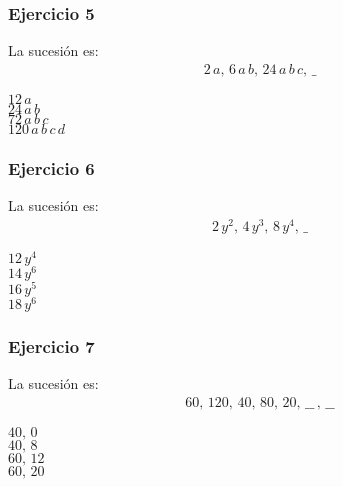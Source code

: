 \begin{frame}
\frametitle{Ejercicio 5}
La sucesión es:
\begin{align*}
2 \, a, \,  6 \, a \, b, \,  24 \, a \, b \, c, \, \_
\end{align*}
\begin{choices}
\choice $12 \, a$ \\
\choice $24 \, a \, b$ \\
\choice $72 \, a \, b \, c$ \\
\choice $120 \, a \, b \, c \, d$ \\
\end{choices}
\pause
{}
\end{frame}
\begin{frame}
\frametitle{Ejercicio 6}
La sucesión es:
\begin{align*}
2 \, y^{2}, \,  4 \, y^{3}, \, 8 \, y^{4},  \, \_
\end{align*}
\begin{choices}
\choice $12 \, y^{4}$ \\
\choice $14 \, y^{6}$ \\
\choice $16 \, y^{5}$ \\
\choice $18 \, y^{6}$
\end{choices}
\pause
{}
\end{frame}
\begin{frame}
\frametitle{Ejercicio 7}
La sucesión es:
\begin{align*}
60, \, 120, \, 40, \, 80, \, 20, \, \_\_ \, , \, \_\_
\end{align*}
\begin{choices}
\choice $40, \, 0$ \\
\choice $40, \, 8$ \\
\choice $60, \, 12$ \\
\choice $60, \, 20$
\end{choices}
\pause
{}
\end{frame}
